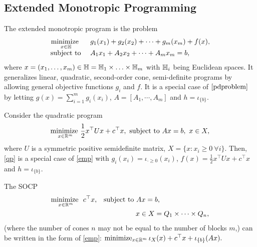 {{\subsection{Extended Monotropic Programming}\label{sec:emp}
The extended monotropic program is the problem
\begin{equation}
\begin{array}{rl}
\underset{x\in\mathbb{H}}{\text{minimize  }} &~g_1(x_1)+g_2(x_2)+\cdots+g_m(x_m)+f(x),\\
\St &~A_1x_1+A_2x_2+\cdots+A_mx_m=b,
\end{array}\label{emp}
\end{equation}
where $x = (x_1, \ldots, x_m) \in \mathbb{H}=\mathbb{H}_1\times\ldots \times \mathbb{H}_m$ with $\mathbb{H}_i$ being Euclidean spaces. It generalizes linear, quadratic, second-order cone, semi-definite programs by allowing  general objective functions $g_i$ and $f$.
It is a special case of $\eqref{pdproblem}$ by letting $g(x)=\displaystyle\sum_{i=1}^m g_i(x_i)$, $A=[A_1,\cdots, A_m]$ and 
$h=\iota_{\{b\}}$.
\begin{example}
Consider the quadratic program
\begin{equation}
\underset{x\in\mathbb{R}^m}{\textnormal{minimize }} \frac{1}{2}x^\top Ux+c^\top x,~\St~ Ax=b,~x\in X,\label{qp}
\end{equation}
where $U$ is a symmetric positive semidefinite matrix, $X=\{x:x_i \geq 0~\forall i\}$.
Then, \eqref{qp} is a special case of \eqref{emp}
with  $g_i(x_i)=\iota_{\cdot\geq 0}(x_i)$, $f(x)=\frac{1}{2}x^\top Ux+c^\top x$ and $h=\iota_{\{b\}}$.
\end{example}
\begin{example}
The SOCP
\begin{align*}
\underset{x\in\mathbb{R}^m}{\textnormal{minimize }} ~c^\top x,&\quad\St~ Ax=b,\\
&\hspace{56pt} x\in X=Q_1\times \cdots\times Q_{n},
\end{align*}
(where the number of cones $n$ may not be equal to the number of blocks $m$,) can be written in the form of \eqref{emp}: $\operatorname*{minimize}_{x\in\mathbb{R}^m} \iota_X(x)+c^\top x+\iota_{\{b\}}(Ax).$ %
\end{example}
}}
